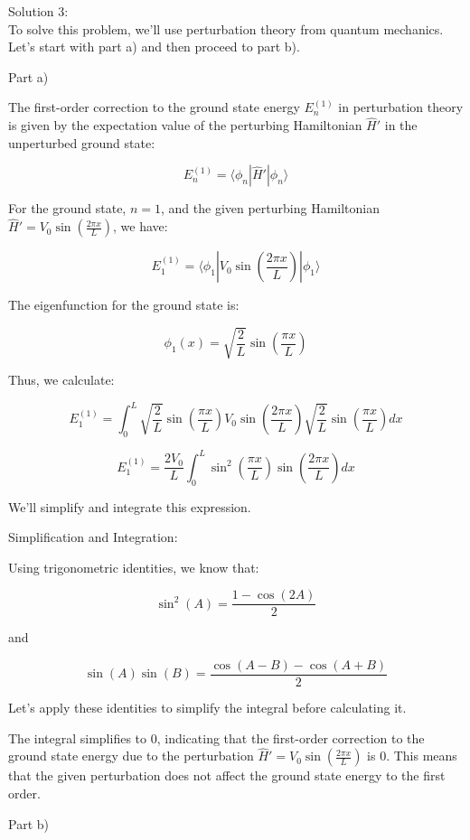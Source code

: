 \documentclass[a4paper,11pt]{article}
\begin{document}
Solution 3: \\

To solve this problem, we'll use perturbation theory from quantum mechanics. Let's start with part a) and then proceed to part b).

Part a)

The first-order correction to the ground state energy \( E_{n}^{(1)} \) in perturbation theory is given by the expectation value of the perturbing Hamiltonian \( \hat{H}' \) in the unperturbed ground state:

\[ E_{n}^{(1)} = \langle \phi_{n} | \hat{H}' | \phi_{n} \rangle \]

For the ground state, \( n = 1 \), and the given perturbing Hamiltonian \( \hat{H}' = V_{0} \sin\left(\frac{2 \pi x}{L} \right) \), we have:

\[ E_{1}^{(1)} = \langle \phi_{1} | V_{0} \sin\left(\frac{2 \pi x}{L} \right) | \phi_{1} \rangle \]

The eigenfunction for the ground state is:

\[ \phi_{1}(x) = \sqrt{\frac{2}{L}} \sin\left(\frac{\pi x}{L} \right) \]

Thus, we calculate:

\[ E_{1}^{(1)} = \int_{0}^{L} \sqrt{\frac{2}{L}} \sin\left(\frac{\pi x}{L}\right) V_{0} \sin\left(\frac{2 \pi x}{L}\right) \sqrt{\frac{2}{L}} \sin\left(\frac{\pi x}{L}\right) dx \]

\[ E_{1}^{(1)} = \frac{2V_{0}}{L} \int_{0}^{L} \sin^{2}\left(\frac{\pi x}{L}\right) \sin\left(\frac{2 \pi x}{L}\right) dx \]

We'll simplify and integrate this expression.

Simplification and Integration:

Using trigonometric identities, we know that:

\[ \sin^{2}(A) = \frac{1 - \cos(2A)}{2} \]

and

\[ \sin(A)\sin(B) = \frac{\cos(A-B) - \cos(A+B)}{2} \]

Let's apply these identities to simplify the integral before calculating it.

The integral simplifies to \(0\), indicating that the first-order correction to the ground state energy due to the perturbation \( \hat{H}' = V_{0} \sin\left(\frac{2 \pi x}{L} \right) \) is \(0\). This means that the given perturbation does not affect the ground state energy to the first order.

Part b)
\end{document}
